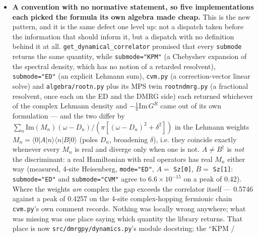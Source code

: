 \documentclass[11pt]{article}
\begin{document}
\begin{itemize}
    fallback can return, against \texttt{mode.VALID\_MODES} via
    \texttt{mode.\_check\_mode}. Worth knowing alongside it: the pure
    algebra primitives (\texttt{overlap}, \texttt{aMb},
    \texttt{random\_state}, \texttt{reduced\_dm},
    \texttt{compute\_entropy\_single}) deliberately call
    \texttt{resolve\_mode} rather than \texttt{get\_mode} --- they need to
    see the automatic ED fallbacks, but not \texttt{get\_mode()}'s
    conserved-sector guard, which is about \emph{which ground state
    answers a solve} and not about an inner product between two states
    the caller already holds.
  \item \textbf{A convention with no normative statement, so five
    implementations each picked the formula its own algebra made cheap.}
    This is the new pattern, and it is the same defect one level up: not
    a dispatch taken before the information that should inform it, but a
    dispatch with no definition behind it at all.
    \texttt{get\_dynamical\_correlator} promised that every
    \texttt{submode} returns the same quantity, while
    \texttt{submode="KPM"} (a Chebyshev expansion of the spectral
    density, which has no notion of a retarded resolvent),
    \texttt{submode="ED"} (an explicit Lehmann sum), \texttt{cvm.py} (a
    correction-vector linear solve) and \texttt{algebra/rootn.py} plus
    its MPS twin \texttt{rootndmrg.py} (a fractional resolvent, once each
    on the ED and the DMRG side) each returned whichever of the complex
    Lehmann density and $-\frac{1}{\pi}\mathrm{Im}\,G^R$ came out of its own
    formulation --- and the two differ by
    $\sum_n \mathrm{Im}(M_n)(\omega-D_n)/(\pi[(\omega-D_n)^2+\delta^2])$
    in the Lehmann weights
    $M_n = \langle 0|A|n\rangle\langle n|B|0\rangle$ (poles $D_n$,
    broadening $\delta$), i.e. they coincide
    exactly whenever every $M_n$ is real and diverge only when one is
    not. $A \neq B^\dagger$ is \emph{not} the discriminant: a real
    Hamiltonian with real operators has real $M_n$ either way (measured,
    4-site Heisenberg, \texttt{mode="ED"}, $A=$ \texttt{Sz[0]},
    $B=$ \texttt{Sz[1]}: \texttt{submode="ED"} and \texttt{submode="CVM"}
    agree to $6.6\times10^{-15}$ on a peak of 0.42). Where the weights
    \emph{are} complex the gap exceeds the correlator itself --- 0.5746
    against a peak of 0.4257 on the 4-site complex-hopping fermionic
    chain \texttt{cvm.py}'s own comment records. Nothing was
    locally wrong anywhere; what was missing was one place saying which
    quantity the library returns. That place is now
    \texttt{src/dmrgpy/dynamics.py}'s module docstring; the ``KPM /

\end{itemize}
\end{document}
